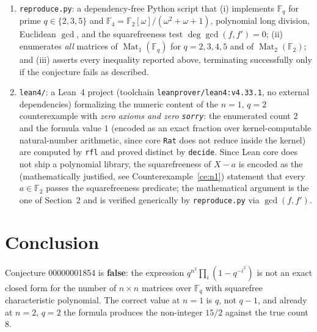 \documentclass[11pt]{article}
\newcommand{\Fq}{\mathbb{F}_q}
\newcommand{\Mat}{\operatorname{Mat}}
\begin{document}
\begin{enumerate}
  \item \texttt{reproduce.py}: a dependency-free Python script that
  (i) implements $\Fq$ for prime $q \in \{2,3,5\}$ and
  $\mathbb{F}_4 = \mathbb{F}_2[\omega]/(\omega^2+\omega+1)$, polynomial long
  division, Euclidean $\gcd$, and the squarefreeness test
  $\deg\gcd(f, f') = 0$; (ii) enumerates \emph{all} matrices of
  $\Mat_1(\Fq)$ for $q = 2,3,4,5$ and of $\Mat_2(\mathbb{F}_2)$; and
  (iii) asserts every inequality reported above, terminating successfully
  only if the conjecture fails as described.
  \item \texttt{lean4/}: a Lean~4 project (toolchain
  \texttt{leanprover/lean4:v4.33.1}, no external dependencies) formalizing the
  numeric content of the $n = 1$, $q = 2$ counterexample with
  \emph{zero axioms and zero \texttt{sorry}}: the enumerated count $2$ and the
  formula value $1$ (encoded as an exact fraction over kernel-computable
  natural-number arithmetic, since core \texttt{Rat} does not reduce inside
  the kernel) are computed by \texttt{rfl} and proved distinct by
  \texttt{decide}. Since Lean core does not ship a polynomial library, the
  squarefreeness of $X - a$ is encoded as the (mathematically justified, see
  Counterexample~\ref{ce:n1}) statement that every $a \in \mathbb{F}_2$ passes
  the squarefreeness predicate; the mathematical argument is the one of
  Section~2 and is verified generically by \texttt{reproduce.py} via
  $\gcd(f, f')$.
\end{enumerate}

\section{Conclusion}

Conjecture 00000001854 is \textbf{false}: the expression
$q^{n^2}\prod_i(1 - q^{-i^2})$ is not an exact closed form for the number of
$n \times n$ matrices over $\Fq$ with squarefree characteristic polynomial.
The correct value at $n = 1$ is $q$, not $q - 1$, and already at $n = 2$,
$q = 2$ the formula produces the non-integer $15/2$ against the true count $8$.
\end{document}
